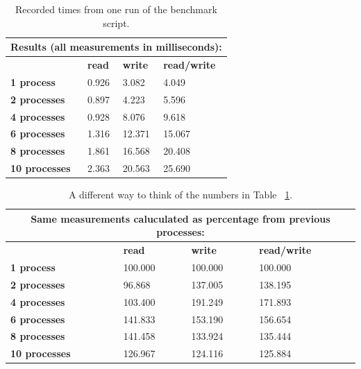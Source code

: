 \documentclass[final,a4paper]{article}
\begin{document}
\begin{table}[H]
  \centering
  \begin{tabular}{|l|l|l|l|}
    \hline
    \multicolumn{4}{|c|}{\bf Results (all measurements in milliseconds):}\\
    \hline
    \hline
    & {\bf read } & { \bf write } & { \bf read/write } \\
    \hline
    { \bf 1 process }    & 0.926 &  3.082 &  4.049 \\
    \hline
    { \bf 2 processes }  & 0.897 &  4.223 &  5.596 \\
    \hline
    { \bf 4 processes }  & 0.928 &  8.076 &  9.618 \\
    \hline
    { \bf 6 processes }  & 1.316 & 12.371 & 15.067 \\
    \hline
    { \bf 8 processes }  & 1.861 & 16.568 & 20.408 \\
    \hline
    { \bf 10 processes } & 2.363 & 20.563 & 25.690 \\
    \hline
  \end{tabular}
  \caption{Recorded times from one run of the benchmark script.}
  \label{table1}
\end{table}

\begin{table}[H]
  \centering
  \begin{tabular}{|l|l|l|l|}
    \hline
    \multicolumn{4}{|c|}{\bf Same measurements caluculated as percentage from
      previous processes:}\\
    \hline
    \hline
    & {\bf read } & { \bf write } & { \bf read/write } \\
    \hline
    { \bf 1 process }    & 100.000 & 100.000 & 100.000 \\
    \hline
    { \bf 2 processes }  &  96.868 & 137.005 & 138.195 \\
    \hline
    { \bf 4 processes }  & 103.400 & 191.249 & 171.893 \\
    \hline
    { \bf 6 processes }  & 141.833 & 153.190 & 156.654 \\
    \hline
    { \bf 8 processes }  & 141.458 & 133.924 & 135.444 \\
    \hline
    { \bf 10 processes } & 126.967 & 124.116 & 125.884 \\
    \hline
  \end{tabular}
  \caption{A different way to think of the numbers in Table ~\ref{table1}.}
  \label{table2}
\end{table}
\end{document}
